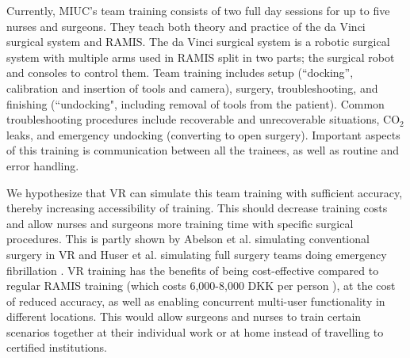 \documentclass[conference]{IEEEtran}
\begin{document}
Currently, MIUC's team training consists of two full day sessions for up to five nurses and surgeons. They teach both theory and practice of the da Vinci surgical system and RAMIS. The da Vinci surgical system is a robotic surgical system with multiple arms used in RAMIS split in two parts; the surgical robot and consoles to control them. Team training includes setup (``docking'', calibration and insertion of tools and camera), surgery, troubleshooting, and finishing (``undocking", including removal of tools from the patient). Common troubleshooting procedures include recoverable and unrecoverable situations, CO$_2$ leaks, and emergency undocking (converting to open surgery). Important aspects of this training is communication between all the trainees, as well as routine and error handling.

We hypothesize that VR can simulate this team training with sufficient accuracy, thereby increasing accessibility of training. This should decrease training costs and allow nurses and surgeons more training time with specific surgical procedures. This is partly shown by Abelson et al. simulating conventional surgery in VR and Huser et al. simulating full surgery teams doing emergency fibrillation \citep{abelson_virtual_2015,huser_simulated_2014}. VR training has the benefits of being cost-effective compared to regular RAMIS training (which costs 6,000-8,000 DKK per person \citep{miuc_miuc_nodate}), at the cost of reduced accuracy, as well as enabling concurrent multi-user functionality in different locations. This would allow surgeons and nurses to train certain scenarios together at their individual work or at home instead of travelling to certified institutions. 
\end{document}
